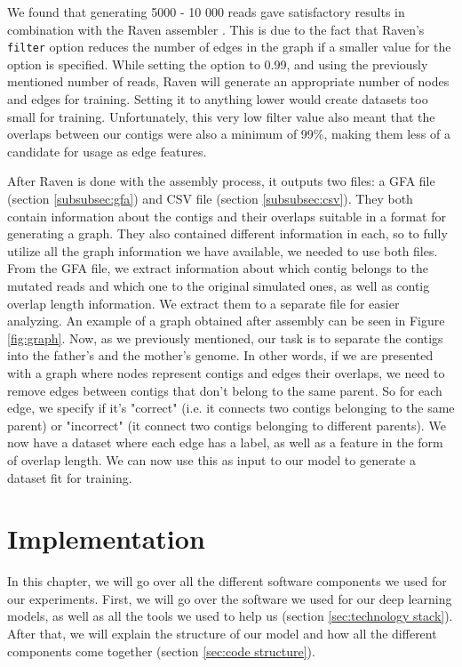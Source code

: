 \documentclass[times, utf8, diplomski, english]{fer_eng}
\begin{document}
We found that generating 5000 - 10 000 reads gave satisfactory results in combination with the Raven assembler \cite{Vaser}. This is due to the fact that Raven's \texttt{filter} option reduces the number of edges in the graph if a smaller value for the option is specified. While setting the option to 0.99, and using the previously mentioned number of reads, Raven will generate an appropriate number of nodes and edges for training. Setting it to anything lower would create datasets too small for training. Unfortunately, this very low filter value also meant that the overlaps between our contigs were also a minimum of 99\%, making them less of a candidate for usage as edge features.

After Raven is done with the assembly process, it outputs two files: a GFA file (section \ref{subsubsec:gfa}) and CSV file (section \ref{subsubsec:csv}). They both contain information about the contigs and their overlaps suitable in a format for generating a graph. They also contained different information in each, so to fully utilize all the graph information we have available, we needed to use both files. From the GFA file, we extract information about which contig belongs to the mutated reads and which one to the original simulated ones, as well as contig overlap length information. We extract them to a separate file for easier analyzing. An example of a graph obtained after assembly can be seen in Figure \ref{fig:graph}. Now, as we previously mentioned, our task is to separate the contigs into the father's and the mother's genome. In other words, if we are presented with a graph where nodes represent contigs and edges their overlaps, we need to remove edges between contigs that don't belong to the same parent. So for each edge, we specify if it's "correct" (i.e. it connects two contigs belonging to the same parent) or "incorrect" (it connect two contigs belonging to different parents). We now have a dataset where each edge has a label, as well as a feature in the form of overlap length. We can now use this as input to our model to generate a dataset fit for training.

\chapter{Implementation}

In this chapter, we will go over all the different software components we used for our experiments. First, we will go over the software we used for our deep learning models, as well as all the tools we used to help us (section \ref{sec:technology stack}). After that, we will explain the structure of our model and how all the different components come together (section \ref{sec:code structure}).
\end{document}
